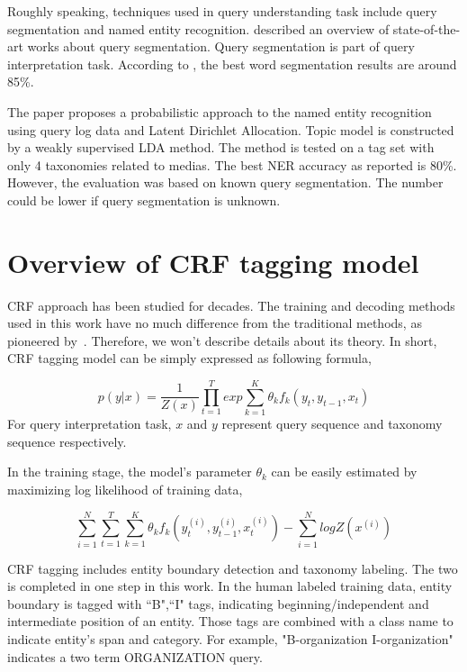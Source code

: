\documentclass{acm_proc_article-sp}
\begin{document}
Roughly speaking, techniques used in query understanding task include query segmentation and named entity recognition. 
\cite{Hagen:2012} described an overview of state-of-the-art works about query segmentation. Query segmentation is part of query interpretation task. According to \cite{Hagen:2012}, the best word segmentation results are around 85\%. 

The paper \cite{Guo:2009:NER} proposes a probabilistic approach to the named entity recognition using query log data and Latent Dirichlet Allocation. Topic model is constructed by a weakly supervised LDA method. The method is tested on a tag set with only 4 taxonomies related to medias. The best NER accuracy as reported is 80\%. However, the evaluation was based on known query segmentation. The number could be lower if query segmentation is unknown.



\section{Overview of CRF tagging model}


CRF approach has been studied for decades. The training and decoding methods used in this work have no much difference from the traditional methods, as pioneered by~\cite{lafferty:2001}. Therefore, we won't describe details about its theory. In short, 
CRF tagging model can be simply expressed as following formula,

\begin{equation}
p(y|x)=\frac{1}{Z(x)}\prod_{t=1}^{T}exp{\sum_{k=1}^{K}\theta_{k}f_{k}(y_{t},y_{t-1},x_{t})}
\label{eq:crf}
\end{equation}
For query interpretation task, $x$ and $y$ represent query sequence and taxonomy sequence respectively.

In the training stage, the model's parameter $\theta_{k}$ can be easily estimated by maximizing log likelihood of training data,

$$
\sum_{i=1}^{N}\sum_{t=1}^{T}\sum_{k=1}^{K}\theta_{k}f_{k}(y_{t}^{(i)},y_{t-1}^{(i)},x_{t}^{(i)})-\sum_{i=1}^{N}logZ(x^{(i)})
$$ 

CRF tagging includes entity boundary detection and taxonomy labeling. The two is completed in one step in this work. 
In the human labeled training data, entity boundary is tagged with ``B",``I" tags, indicating beginning/independent and intermediate position of an entity. Those tags are combined with a class name to indicate entity's span and category. For example, "B-organization I-organization" indicates a two term ORGANIZATION query. 
\end{document}
